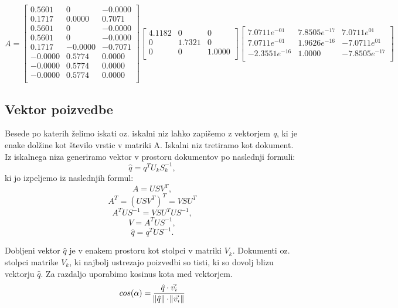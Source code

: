 \documentclass{article}
\begin{document}
\[
A = \begin{bmatrix}
    0.5601 &       0 & -0.0000 \\ 
   0.1717 &   0.0000 &  0.7071 \\
   0.5601 &        0 & -0.0000 \\
   0.5601 &        0 & -0.0000 \\
   0.1717 &  -0.0000 & -0.7071 \\
  -0.0000 &   0.5774 &  0.0000 \\
  -0.0000 &   0.5774 &  0.0000 \\
  -0.0000 &   0.5774 &  0.0000 \\
 \end{bmatrix}
 \begin{bmatrix}
    4.1182 &        0 &        0 \\ 
        0  &   1.7321 &        0 \\
        0  &        0 &   1.0000 \\
 \end{bmatrix}
 \begin{bmatrix}
     7.0711e^{-01} &   7.8505e^{-17} &  7.0711e^{01} \\ 
     7.0711e^{-01} &   1.9626e^{-16} & -7.0711e^{01} \\
   -2.3551e^{-16} &   1.0000         & -7.8505e^{-17} \\
 \end{bmatrix}
\]

\subsection{Vektor poizvedbe}
\par Besede po katerih želimo iskati oz. iskalni niz lahko zapišemo z vektorjem \textit{q}, ki je enake dolžine kot število vrstic v matriki A. Iskalni niz tretiramo kot dokument. Iz iskalnega niza generiramo vektor v prostoru dokumentov po naslednji formuli:
\[ \hat{q} = q^TU_kS_k^{-1},\]
ki jo izpeljemo iz naslednjih formul:
\[ A = USV^T,\]
\[ A^T = (USV^T)^T = VSU^T\]
\[ A^TUS^{-1} = VSU^TUS^{-1},\]
\[ V = A^TUS^{-1},\]
\[ \hat{q} = q^TUS^{-1}.\]
\par Dobljeni vektor $\hat{q}$ je v enakem prostoru kot stolpci v matriki $V_k$. Dokumenti oz. stolpci matrike $V_k$, ki najbolj ustrezajo poizvedbi so tisti, ki so dovolj blizu vektorju $\hat{q}$. Za razdaljo uporabimo kosinus kota med vektorjem. 
\[ cos(\alpha) = \frac{\hat{q} \cdot \Vec{v_i}}{\norm{\hat{q}} \cdot \norm{\Vec{v_i}}}\]
\end{document}
